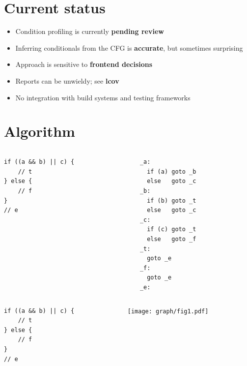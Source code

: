 \documentclass[xcolor = {dvipsnames, table}, aspectratio=169]{beamer}
\begin{document}
\section{Current status}

\begin{frame}
    \begin{itemize}
        \item Condition profiling is currently \textbf{pending review}
        \item Inferring conditionals from the CFG is \textbf{accurate}, but
            sometimes surprising
        \item Approach is sensitive to \textbf{frontend decisions}
        \item Reports can be unwieldy; see \textbf{lcov}
        \item No integration with build systems and testing frameworks
    \end{itemize}
\end{frame}

\section{Algorithm}

\begin{frame}[fragile]
    \begin{columns}
        \begin{column}{0.4\textwidth}
            \begin{lstlisting}[basicstyle = \footnotesize\ttfamily]
if ((a && b) || c) {
    // t
} else {
    // f
}
// e
            \end{lstlisting}
        \end{column}
        \begin{column}{0.4\textwidth}
            \begin{lstlisting}[basicstyle = \footnotesize\ttfamily]
_a:
  if (a) goto _b
  else   goto _c
_b:
  if (b) goto _t
  else   goto _c
_c:
  if (c) goto _t
  else   goto _f
_t:
  goto _e
_f:
  goto _e
_e:
            \end{lstlisting}
        \end{column}
    \end{columns}
\end{frame}

\begin{frame}[fragile]
    \begin{columns}
        \begin{column}{0.4\textwidth}
            \begin{lstlisting}[basicstyle = \footnotesize\ttfamily]
if ((a && b) || c) {
    // t
} else {
    // f
}
// e
            \end{lstlisting}
        \end{column}
        \begin{column}{0.4\textwidth}
            \texttt{[image: graph/fig1.pdf]}
        \end{column}
    \end{columns}
\end{frame}
\end{document}

